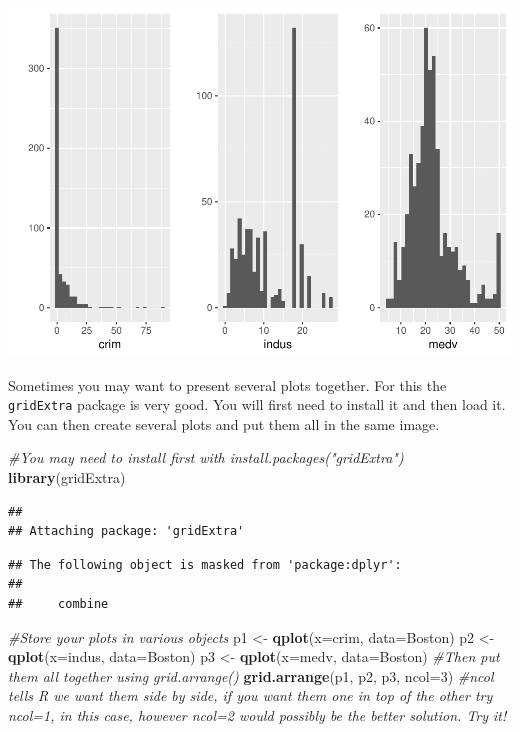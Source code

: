 \documentclass[]{book}
\newenvironment{Shaded}{\begin{snugshade}}{\end{snugshade}}
\newcommand{\CommentTok}[1]{\textcolor[rgb]{0.56,0.35,0.01}{\textit{#1}}}
\newcommand{\DataTypeTok}[1]{\textcolor[rgb]{0.13,0.29,0.53}{#1}}
\newcommand{\DecValTok}[1]{\textcolor[rgb]{0.00,0.00,0.81}{#1}}
\newcommand{\KeywordTok}[1]{\textcolor[rgb]{0.13,0.29,0.53}{\textbf{#1}}}
\newcommand{\NormalTok}[1]{#1}
\newcommand{\StringTok}[1]{\textcolor[rgb]{0.31,0.60,0.02}{#1}}
\theoremstyle{definition}
\theoremstyle{definition}
\theoremstyle{definition}
\theoremstyle{remark}
\begin{document}
\includegraphics{03-visualisation_files/figure-latex/unnamed-chunk-57-1.pdf}

Sometimes you may want to present several plots together. For this the
\texttt{gridExtra} package is very good. You will first need to install
it and then load it. You can then create several plots and put them all
in the same image.

\begin{Shaded}
\begin{Highlighting}[]
\CommentTok{#You may need to install first with install.packages("gridExtra")}
\KeywordTok{library}\NormalTok{(gridExtra)}
\end{Highlighting}
\end{Shaded}

\begin{verbatim}
## 
## Attaching package: 'gridExtra'
\end{verbatim}

\begin{verbatim}
## The following object is masked from 'package:dplyr':
## 
##     combine
\end{verbatim}

\begin{Shaded}
\begin{Highlighting}[]
\CommentTok{#Store your plots in various objects}
\NormalTok{p1 <-}\StringTok{ }\KeywordTok{qplot}\NormalTok{(}\DataTypeTok{x=}\NormalTok{crim, }\DataTypeTok{data=}\NormalTok{Boston)}
\NormalTok{p2 <-}\StringTok{ }\KeywordTok{qplot}\NormalTok{(}\DataTypeTok{x=}\NormalTok{indus, }\DataTypeTok{data=}\NormalTok{Boston)}
\NormalTok{p3 <-}\StringTok{ }\KeywordTok{qplot}\NormalTok{(}\DataTypeTok{x=}\NormalTok{medv, }\DataTypeTok{data=}\NormalTok{Boston)}
\CommentTok{#Then put them all together using grid.arrange()}
\KeywordTok{grid.arrange}\NormalTok{(p1, p2, p3, }\DataTypeTok{ncol=}\DecValTok{3}\NormalTok{) }\CommentTok{#ncol tells R we want them side by side, if you want them one in top of the other try ncol=1, in this case, however ncol=2 would possibly be the better solution. Try it!}
\end{Highlighting}
\end{Shaded}
\end{document}
